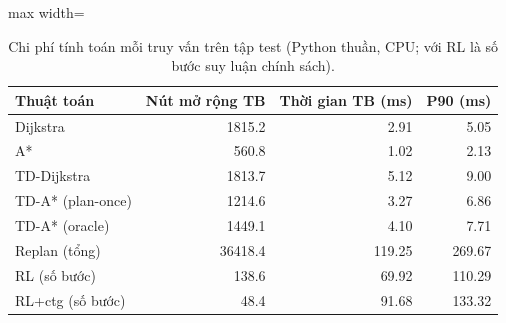 \begin{table}[!htbp]
\centering
\small
\caption{Chi phí tính toán mỗi truy vấn trên tập test (Python thuần, CPU; với RL là số bước suy luận chính sách).}
\label{tab:tab_expansions}
\begin{adjustbox}{max width=\linewidth}
\begin{tabular}{lrrr}
\toprule
Thuật toán & Nút mở rộng TB & Thời gian TB (ms) & P90 (ms) \\
\midrule
Dijkstra & 1815.2 & 2.91 & 5.05 \\
A* & 560.8 & 1.02 & 2.13 \\
TD-Dijkstra & 1813.7 & 5.12 & 9.00 \\
TD-A* (plan-once) & 1214.6 & 3.27 & 6.86 \\
TD-A* (oracle) & 1449.1 & 4.10 & 7.71 \\
Replan (tổng) & 36418.4 & 119.25 & 269.67 \\
RL (số bước) & 138.6 & 69.92 & 110.29 \\
RL+ctg (số bước) & 48.4 & 91.68 & 133.32 \\
\bottomrule
\end{tabular}
\end{adjustbox}
\end{table}
